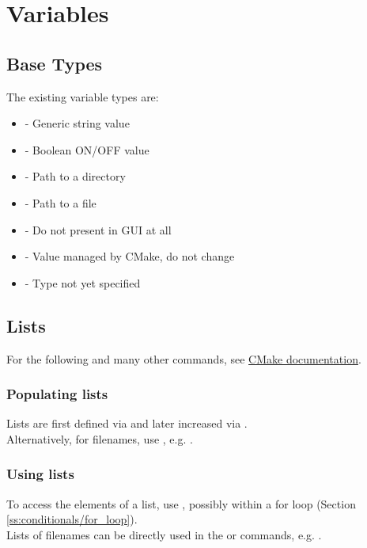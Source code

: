 \section{Variables} \label{s:variables}



\subsection{Base Types} \label{ss:variables/base_types}
The existing variable types are:
\begin{itemize}
    \item {} - Generic string value
    \item {} - Boolean ON/OFF value
    \item {} - Path to a directory
    \item {} - Path to a file
    \item {} - Do not present in GUI at all
    \item {} - Value managed by CMake, do not change
    \item {} - Type not yet specified
\end{itemize}



\subsection{Lists}
For the following and many other commands, see \href{https://cmake.org/cmake/help/latest/command/list.html}{CMake documentation}.

\subsubsection{Populating lists}
Lists are first defined via  and later increased via . \\
Alternatively, for filenames, use , e.g. .

\subsubsection{Using lists}
To access the elements of a list, use , possibly within a for loop (Section \ref{ss:conditionals/for_loop}). \\
Lists of filenames can be directly used in the  or  commands, e.g. .



